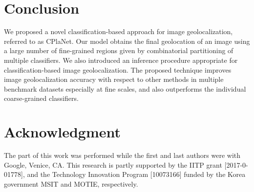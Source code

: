 \documentclass[runningheads]{llncs}
\begin{document}
\iffalse
\paragraph{Performance issues [R1, R2]}
While our algorithm does not improve baseline approaches at coarse levels (country and continent), the motivation of combinatorial partitioning is to improve the accuracy at fine-grained levels (street and city) which is generally more important.
According to Table~2, our full model (CP[1-5,PlaNet]) obtains 35\% and 22\% relative gains from PlaNet and from individual classifiers respectively at street level.
Figure~\ref{fig:graph} shows that our method outperforms all base classifiers consistently and significantly at street and city levels.
These improvements are statistically significant as we tested on a very large test set.
\fi





\iffalse
\begin{figure}[t]
\centering
\texttt{[image: ./rebuttal/rebut\_figs/graph.pdf]}
\caption{
Geolocational accuracies on FlickrGeo varying the allowable error up to city-level (lower lines are better).
}
\label{fig:graph}
\end{figure}
\fi


 

\section{Conclusion}
\label{sec:conclusion}

We proposed a novel classification-based approach for image geolocalization, {referred to as CPlaNet}.
Our model obtains the final geolocation of an image using a large number of fine-grained regions given by combinatorial partitioning of multiple classifiers.
We also introduced an inference procedure appropriate for classification-based image geolocalization.
The proposed technique improves image geolocalization accuracy with respect to other methods in multiple benchmark datasets especially at fine scales, and also outperforms the individual coarse-grained classifiers.
%
 
\section*{Acknowledgment}
The part of this work was performed while the first and last authors were with Google, Venice, CA.
This research is partly supported by the IITP grant [2017-0-01778], and the Technology Innovation Program [10073166] funded by the Korea government MSIT and MOTIE, respectively.
\end{document}
